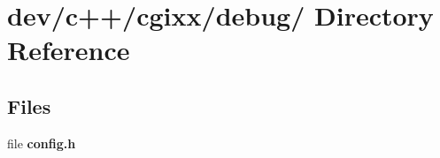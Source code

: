 \section{dev/c++/cgixx/debug/ Directory Reference}
\label{dir_cf2889fbe1192a898a95d7ad850d8aad}
\subsection*{Files}
\begin{CompactItemize}
\item 
file \textbf{config.h}
\end{CompactItemize}
